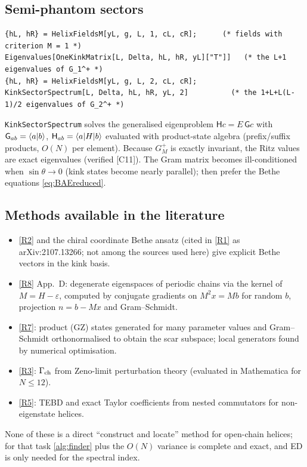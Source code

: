 \documentclass[11pt,a4paper]{article}
\theoremstyle{definition}
\newcommand{\ver}[1]{\textsf{[#1]}}   %
\begin{document}
\subsection{Semi-phantom sectors}
\begin{lstlisting}
{hL, hR} = HelixFieldsM[yL, g, L, 1, cL, cR];      (* fields with criterion M = 1 *)
Eigenvalues[OneKinkMatrix[L, Delta, hL, hR, yL]["T"]]   (* the L+1 eigenvalues of G_1^+ *)
{hL, hR} = HelixFieldsM[yL, g, L, 2, cL, cR];
KinkSectorSpectrum[L, Delta, hL, hR, yL, 2]          (* the 1+L+L(L-1)/2 eigenvalues of G_2^+ *)
\end{lstlisting}
\texttt{KinkSectorSpectrum} solves the generalised eigenproblem $\mathsf H c=E\,\mathsf G c$ with $\mathsf G_{ab}=\braket{a|b}$, $\mathsf H_{ab}=\braket{a|H|b}$ evaluated with product-state algebra (prefix/suffix products, $O(N)$ per element). Because $G_M^+$ is exactly invariant, the Ritz values are exact eigenvalues (verified \ver{C11}). The Gram matrix becomes ill-conditioned when $\sin\theta\to0$ (kink states become nearly parallel); then prefer the Bethe equations \eqref{eq:BAEreduced}.

\subsection{Methods available in the literature}
\begin{itemize}
\item \ref{R2} and the chiral coordinate Bethe ansatz (cited in \ref{R1} as arXiv:2107.13266; not among the sources used here) give explicit Bethe vectors in the kink basis.
\item \ref{R8} App.~D: degenerate eigenspaces of periodic chains via the kernel of $M=H-\varepsilon$, computed by conjugate gradients on $M^2x=Mb$ for random $b$, projection $n=b-Mx$ and Gram--Schmidt.
\item \ref{R7}: product (GZ) states generated for many parameter values and Gram--Schmidt orthonormalised to obtain the scar subspace; local generators found by numerical optimisation.
\item \ref{R3}: $\Gamma_{\rm ch}$ from Zeno-limit perturbation theory (evaluated in Mathematica for $N\le12$).
\item \ref{R5}: TEBD and exact Taylor coefficients from nested commutators for non-eigenstate helices.
\end{itemize}
None of these is a direct ``construct and locate'' method for open-chain helices; for that task \cref{alg:finder} plus the $O(N)$ variance is complete and exact, and ED is only needed for the spectral index.
\end{document}
